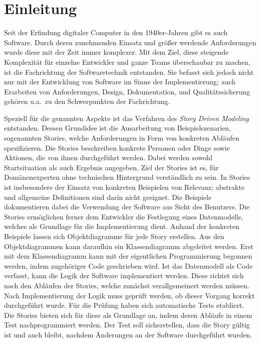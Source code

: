 \chapter{Einleitung}\label{ch:introduction}

Seit der Erfindung digitaler Computer in den 1940er-Jahren gibt es auch Software.
Durch deren zunehmenden Einsatz und größer werdende Anforderungen wurde diese mit der Zeit immer komplexer.
Mit dem Ziel, diese steigende Komplexität für einzelne Entwickler und ganze Teams überschaubar zu machen, ist die Fachrichtung der Softwaretechnik entstanden.
Sie befasst sich jedoch nicht nur mit der Entwicklung von Software im Sinne der Implementierung;
auch Erarbeiten von Anforderungen, Design, Dokumentation, und Qualitätssicherung gehören u.a.\ zu den Schwerpunkten der Fachrichtung.

Speziell für die genannten Aspekte ist das Verfahren des \emph{Story Driven Modeling}~\cite{sdm} entstanden.
Dessen Grundidee ist die Ausarbeitung von Beispielszenarien, sogenannten Stories, welche Anforderungen in Form von konkreten Abläufen spezifizieren.
Die Stories beschreiben konkrete Personen oder Dinge sowie Aktionen, die von ihnen durchgeführt werden.
Dabei werden sowohl Startsituation als auch Ergebnis angegeben.
Ziel der Stories ist es, für Domänenexperten ohne technischen Hintergrund verständlich zu sein.
In Stories ist insbesondere der Einsatz von konkreten Beispielen von Relevanz;
abstrakte und allgemeine Definitionen sind darin nicht geeignet.
Die Beispiele dokumentieren dabei die Verwendung der Software aus Sicht des Benutzers.
Die Stories ermöglichen ferner dem Entwickler die Festlegung eines Datenmodells, welches als Grundlage für die Implementierung dient.
Anhand der konkreten Beispiele lassen sich Objektdiagramme für jede Story erstellen.
Aus den Objektdiagrammen kann daraufhin ein Klassendiagramm abgeleitet werden.
Erst mit dem Klassendiagramm kann mit der eigentlichen Programmierung begonnen werden, indem zugehöriger Code geschrieben wird.
Ist das Datenmodell als Code verfasst, kann die Logik der Software implementiert werden.
Diese richtet sich nach den Abläufen der Stories, welche zunächst verallgemeinert werden müssen.
Nach Implementierung der Logik muss geprüft werden, ob dieser Vorgang korrekt durchgeführt wurde.
Für die Prüfung haben sich automatische Tests etabliert.
Die Stories bieten sich für diese als Grundlage an, indem deren Abläufe in einem Test nachprogrammiert werden.
Der Test soll sicherstellen, dass die Story gültig ist und auch bleibt, nachdem Änderungen an der Software durchgeführt wurden.

